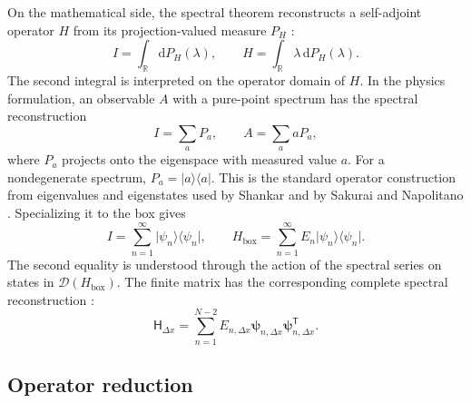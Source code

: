 \documentclass[11pt]{article}
\newcommand{\RR}{\mathbb{R}}
\newcommand{\mat}[1]{\mathsf{#1}}
\newcommand{\vect}[1]{\boldsymbol{#1}}
\begin{document}
On the mathematical side, the spectral theorem reconstructs a self-adjoint operator
$H$ from its projection-valued measure $P_H$ \cite{reedSimon1980,teschl2014}:
\begin{equation}
 I=\int_{\RR}\mathrm{d}P_H(\lambda),
 \qquad
 H=\int_{\RR}\lambda\,\mathrm{d}P_H(\lambda).
 \label{eq:general-spectral-construction}
\end{equation}
The second integral is interpreted on the operator domain of $H$. In the physics
formulation, an observable $A$ with a pure-point spectrum has the spectral
reconstruction
\begin{equation}
 I=\sum_a P_a,
 \qquad
 A=\sum_a aP_a,
 \label{eq:physics-operator-reconstruction}
\end{equation}
where $P_a$ projects onto the eigenspace with measured value $a$. For a
nondegenerate spectrum, $P_a=\lvert a\rangle\langle a\rvert$. This is the standard
operator construction from eigenvalues and eigenstates used by Shankar and by
Sakurai and Napolitano \cite{shankar1994,sakuraiNapolitano2020}. Specializing it to
the box gives
\begin{equation}
 I=\sum_{n=1}^{\infty}
 \lvert\psi_n\rangle\langle\psi_n\rvert,
 \qquad
 H_{\mathrm{box}}=\sum_{n=1}^{\infty}
 E_n\lvert\psi_n\rangle\langle\psi_n\rvert.
 \label{eq:continuum-spectral-construction}
\end{equation}
The second equality is understood through the action of the spectral series on states
in $\mathcal D(H_{\mathrm{box}})$. The finite matrix has the corresponding complete
spectral reconstruction \cite{hornJohnson2013,golubVanLoan2013}:
\begin{equation}
 \mat{H}_{\Delta x}
 =\sum_{n=1}^{N-2}E_{n,\Delta x}
 \vect{\psi}_{n,\Delta x}\vect{\psi}_{n,\Delta x}^{\mathsf T}.
 \label{eq:finite-spectral-construction}
\end{equation}

\subsection{Operator reduction}
\end{document}

